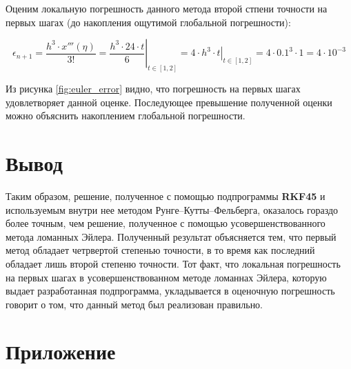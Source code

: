 Оценим локальную погрешность данного метода второй стпени точности на первых шагах (до накопления ощутимой глобальной погрешности):

\[
\epsilon_{n+1} = \frac{h^3 \cdot x'''(\eta)}{3!} = 
\left.\frac{h^3 \cdot 24\cdot t}{6} \right|_{t \in [1,2]} = 
\left.4\cdot h^3\cdot t \right|_{t \in [1,2]} = 
4\cdot 0.1^3\cdot 1 = 4\cdot 10^{-3}
\]

Из рисунка \ref{fig:euler_error} видно, что погрешность на первых шагах удовлетворяет данной оценке. Последующее превышение полученной оценки можно объяснить накоплением глобальной погрешности.

\section{Вывод}

Таким образом, решение, полученное с помощью подпрограммы \textbf{RKF45} и используемым внутри нее методом Рунге--Кутты--Фельберга, оказалось гораздо более точным, чем решение, полученное с помощью усовершенствованного метода ломанных Эйлера. Полученный результат объясняется тем, что первый метод обладает четрвертой степенью точности, в то время как последний обладает лишь второй степеню точности. Тот факт, что локальная погрешность на первых шагах в усовершенствованном методе ломаннах Эйлера, которую выдает разработанная подпрограмма, укладывается в оценочную погрешность говорит о том, что данный метод был реализован правильно.

\section*{Приложение}










